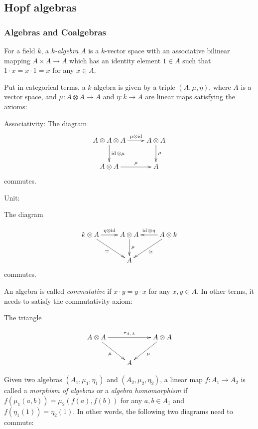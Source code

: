 \documentclass[]{article}
\newcommand{\id}{\operatorname{id}}
\numberwithin{equation}{subsection}
\begin{document}
\subsection{Hopf algebras}
\subsubsection{Algebras and Coalgebras}
For a field $k$, a \emph{$k$-algebra} $A$ is a $k$-vector space with an
associative bilinear mapping $A \times A \to A$ which has an identity element
$1 \in A$ such that $1\cdot x = x\cdot 1 = x$ for any $x \in A$.

Put in categorical terms, a $k$-algebra is given by a triple $(A, \mu, \eta)$,
where $A$ is a vector space, and $\mu: A \otimes A \to A$ and $\eta: k \to A$
are linear maps satisfying the axioms:

Associativity:
The diagram
\begin{equation}
\xymatrix{
A \otimes A \otimes A \ar[d]^-{\id \otimes \mu} \ar[r]^-{\mu \otimes \id} & A \otimes A \ar[d]^-{\mu}\\
 A \otimes A \ar[r]^-\mu & A 
}
\end{equation}
commutes.

Unit: 

The diagram

\begin{equation}
    \xymatrix{
    k \otimes A \ar[r]^-{\eta \otimes \id} \ar[rd]_\simeq & A \otimes A \ar[d]^-\mu & A \otimes k \ar[l]_{\id \otimes \eta} \ar[ld]^-{\simeq} \\
    & A &
    }
\end{equation}
commutes.

An algebra is called \emph{commutative} if $x \cdot y = y \cdot x$ for any $x,y\in A$. In other terms, it needs to satisfy the commutativity axiom:

The triangle 

\begin{equation}
    \xymatrix{
    A \otimes A \ar[rr]^-{\tau_{A,A}} \ar[rd]_\mu & & A \otimes A \ar[ld]^-\mu \\
    & A &
    }
\end{equation}

Given two algebras $(A_1, \mu_1, \eta_1)$ and $(A_2, \mu_2, \eta_2)$, a linear
map $f: A_1 \to A_2$ is called a \emph{morphism of algebras} or a
\emph{algebra homomorphism} if $f(\mu_1(a,b)) = \mu_2(f(a), f(b))$ for any
$a,b\in A_1$ and $f(\eta_1(1)) = \eta_2(1)$. In other words, the following two
diagrams need to commute:
\end{document}
